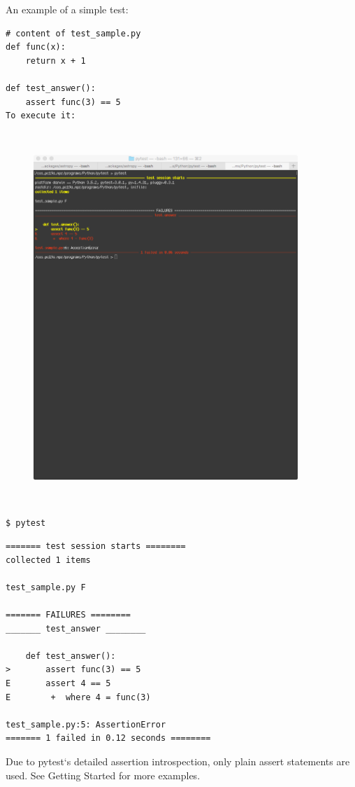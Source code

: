 \documentclass[11pt,a4paper]{article}
\begin{document}
An example of a simple test:
\begin{lstlisting}
# content of test_sample.py
def func(x):
    return x + 1

def test_answer():
    assert func(3) == 5
To execute it:
\end{lstlisting}


\begin{figure}
  \includegraphics [height=14.0cm,width=10.0cm]
  {images/pytest_screengrab.png}
  \centering
  \caption[]{}
  \label{fig:fig2}
\end{figure}


\noindent
{\tt \$ pytest}
\begin{lstlisting}
======= test session starts ========
collected 1 items

test_sample.py F

======= FAILURES ========
_______ test_answer ________

    def test_answer():
>       assert func(3) == 5
E       assert 4 == 5
E        +  where 4 = func(3)

test_sample.py:5: AssertionError
======= 1 failed in 0.12 seconds ========
\end{lstlisting}

Due to pytest‘s detailed assertion introspection, only plain assert
statements are used. See Getting Started for more examples.
\end{document}
